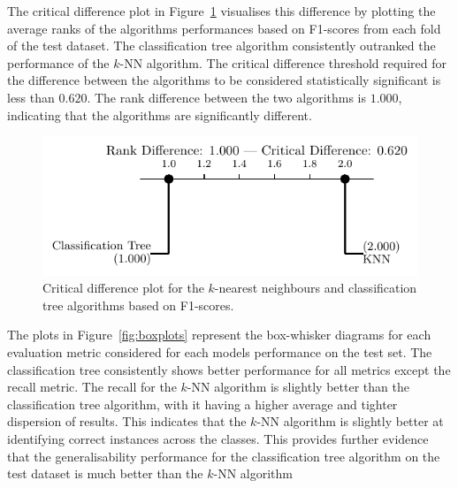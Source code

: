 \documentclass[conference]{IEEEtran}
\begin{document}
	 The critical difference plot in Figure~\ref{fig:cd} visualises this difference by plotting the average ranks of the algorithms performances based on F1-scores from each fold of the test dataset. The classification tree algorithm consistently outranked the performance of the $k$-NN algorithm. The critical difference threshold required for the difference between the algorithms to be considered statistically significant is less than $0.620$. The rank difference between the two algorithms is $1.000$, indicating that the algorithms are significantly different.
	\begin{figure}[H]
		\centering
		\includegraphics[width=\linewidth]{cd_plot.pdf}
		\caption{Critical difference plot for the $k$-nearest neighbours and classification tree algorithms based on F1-scores.}
		\label{fig:cd}
	\end{figure}
	
	The plots in Figure~\ref{fig:boxplots} represent the box-whisker diagrams for each evaluation metric considered for each models performance on the test set. The classification tree consistently shows better performance for all metrics except the recall metric. The recall for the $k$-NN algorithm is slightly better than the classification tree algorithm, with it having a higher average and tighter dispersion of results. This indicates that the $k$-NN algorithm is slightly better at identifying correct instances across the classes. This provides further evidence that the generalisability performance for the classification tree algorithm on the test dataset is much better than the $k$-NN algorithm
	
\end{document}
